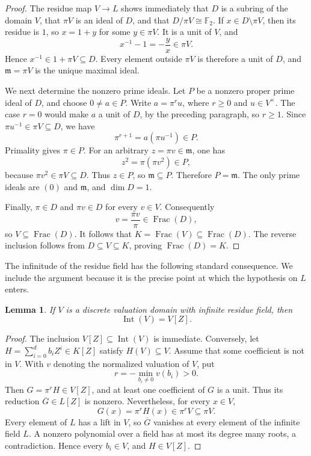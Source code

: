 \documentclass[11pt,reqno]{amsart}
\numberwithin{equation}{section}
\theoremstyle{plain}
\newtheorem{lemma}[theorem]{Lemma}
\theoremstyle{definition}
\theoremstyle{remark}
\newcommand{\Int}{\operatorname{Int}}
\newcommand{\Frac}{\operatorname{Frac}}
\newcommand{\F}{\mathbb F}
\newcommand{\m}{\mathfrak m}
\begin{document}
\begin{proof}
The residue map \(V\to L\) shows immediately that \(D\) is a subring of
the domain \(V\), that \(\pi V\) is an ideal of \(D\), and that
\(D/\pi V\cong\F _2\).  If \(x\in D\setminus\pi V\), then its
residue is \(1\), so \(x=1+y\) for some \(y\in\pi V\).  It is a unit
of \(V\), and
\[
 x^{-1}-1=-\frac{y}{x}\in\pi V.
\]
Hence \(x^{-1}\in 1+\pi V\subseteq D\).  Every element outside
\(\pi V\) is therefore a unit of \(D\), and \(\m=\pi V\) is the unique
maximal ideal.

We next determine the nonzero prime ideals.  Let \(P\) be a nonzero
proper prime ideal of \(D\), and choose \(0\ne a\in P\).  Write
\(a=\pi^r u\), where \(r\geq0\) and \(u\in V^\times\).  The case
\(r=0\) would make \(a\) a unit of \(D\), by the preceding paragraph,
so \(r\geq1\).  Since \(\pi u^{-1}\in\pi V\subseteq D\), we have
\[
 \pi^{r+1}=a(\pi u^{-1})\in P.
\]
Primality gives \(\pi\in P\).  For an arbitrary
\(z=\pi v\in\m\), one has
\[
 z^2=\pi(\pi v^2)\in P,
\]
because \(\pi v^2\in\pi V\subseteq D\).  Thus \(z\in P\), so
\(\m\subseteq P\).  Therefore \(P=\m\).  The only prime ideals are
\((0)\) and \(\m\), and \(\dim D=1\).

Finally, \(\pi\in D\) and \(\pi v\in D\) for every \(v\in V\).
Consequently
\[
 v=\frac{\pi v}{\pi}\in\Frac(D),
\]
so \(V\subseteq\Frac(D)\).  It follows that
\(K=\Frac(V)\subseteq\Frac(D)\).  The reverse inclusion follows from
\(D\subseteq V\subseteq K\), proving \(\Frac(D)=K\).
\end{proof}

The infinitude of the residue field has the following standard
consequence.  We include the argument because it is the precise point
at which the hypothesis on \(L\) enters.

\begin{lemma}\label{lem:IntV}
If \(V\) is a discrete valuation domain with infinite residue field,
then
\[
 \Int(V)=V[Z].
\]
\end{lemma}

\begin{proof}
The inclusion \(V[Z]\subseteq\Int(V)\) is immediate.  Conversely, let
\(H=\sum_{i=0}^d b_iZ^i\in K[Z]\) satisfy \(H(V)\subseteq V\).
Assume that some coefficient is not in \(V\).  With \(v\) denoting the
normalized valuation of \(V\), put
\[
 r=-\min_{b_i\ne0}v(b_i)>0.
\]
Then \(G=\pi^rH\in V[Z]\), and at least one coefficient of \(G\) is a
unit.  Thus its reduction \(\overline G\in L[Z]\) is nonzero.
Nevertheless, for every \(x\in V\),
\[
 G(x)=\pi^rH(x)\in\pi^rV\subseteq\pi V.
\]
Every element of \(L\) has a lift in \(V\), so \(\overline G\) vanishes
at every element of the infinite field \(L\).  A nonzero polynomial
over a field has at most its degree many roots, a contradiction.
Hence every \(b_i\in V\), and \(H\in V[Z]\).
\end{proof}
\end{document}
